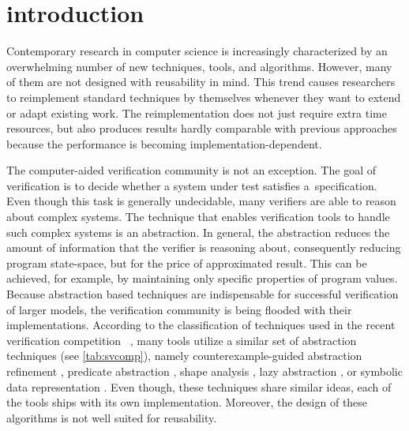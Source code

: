 \chapter{introduction}
\label{ch:intro}


Contemporary research in computer science is increasingly characterized by
an overwhelming number of new techniques, tools, and algorithms.  However, many
of them are not designed with reusability in mind.  This trend causes
researchers to reimplement standard techniques by themselves whenever they want
to extend or adapt existing work.  The reimplementation does not just require
extra time resources, but also produces results hardly comparable with previous
approaches because the performance is becoming implementation-dependent.

The computer-aided verification community is not an exception. The goal of
verification is to decide whether a system under test satisfies
a~specification. Even though this task is generally undecidable, many verifiers
are able to reason about complex systems. The technique that enables
verification tools to handle such complex systems is an abstraction. In
general, the abstraction reduces the amount of information that the verifier is
reasoning about, consequently reducing program state-space, but for the price
of approximated result. This can be achieved, for example, by maintaining only
specific properties of program values. Because abstraction based techniques are
indispensable for successful verification of larger models, the verification
community is being flooded with their implementations.  According to the
classification of techniques used in the recent verification competition
\svcomp~\cite{SVCOMP2019}, many tools utilize a similar set of abstraction
techniques (see \autoref{tab:svcomp}), namely coun\-ter\-example-guided abstraction refinement
\cite{Clarke20}, predicate abstraction
\cite{Flanagan02}, shape analysis \cite{Yang2008}, lazy abstraction
\cite{Henzinger2002}, or symbolic data representation
\cite{King76,Burch1990,Majumdar2018}. Even though, these techniques share similar
ideas, each of the tools ships with its own implementation.  Moreover, the
design of these algorithms is not well suited for reusability.

